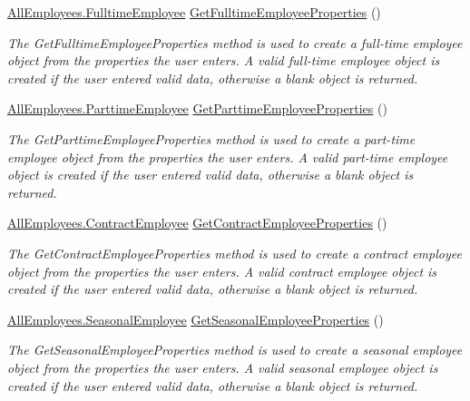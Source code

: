 \begin{DoxyCompactItemize}
\item 
\hyperlink{class_all_employees_1_1_fulltime_employee}{All\+Employees.\+Fulltime\+Employee} \hyperlink{class_the_company_1_1_container_a06dd9fa578f03d192bb0782b19b11c22}{Get\+Fulltime\+Employee\+Properties} ()
\begin{DoxyCompactList}\small\item\em The Get\+Fulltime\+Employee\+Properties method is used to create a full-\/time employee object from the properties the user enters. A valid full-\/time employee object is created if the user entered valid data, otherwise a blank object is returned. \end{DoxyCompactList}\item 
\hyperlink{class_all_employees_1_1_parttime_employee}{All\+Employees.\+Parttime\+Employee} \hyperlink{class_the_company_1_1_container_abf8f2eb5f6f39ff539f0f051979a427a}{Get\+Parttime\+Employee\+Properties} ()
\begin{DoxyCompactList}\small\item\em The Get\+Parttime\+Employee\+Properties method is used to create a part-\/time employee object from the properties the user enters. A valid part-\/time employee object is created if the user entered valid data, otherwise a blank object is returned. \end{DoxyCompactList}\item 
\hyperlink{class_all_employees_1_1_contract_employee}{All\+Employees.\+Contract\+Employee} \hyperlink{class_the_company_1_1_container_aff37e43af89a37628263cd78b80a60a5}{Get\+Contract\+Employee\+Properties} ()
\begin{DoxyCompactList}\small\item\em The Get\+Contract\+Employee\+Properties method is used to create a contract employee object from the properties the user enters. A valid contract employee object is created if the user entered valid data, otherwise a blank object is returned. \end{DoxyCompactList}\item 
\hyperlink{class_all_employees_1_1_seasonal_employee}{All\+Employees.\+Seasonal\+Employee} \hyperlink{class_the_company_1_1_container_aec76c3159677efddcb47b08ce8404478}{Get\+Seasonal\+Employee\+Properties} ()
\begin{DoxyCompactList}\small\item\em The Get\+Seasonal\+Employee\+Properties method is used to create a seasonal employee object from the properties the user enters. A valid seasonal employee object is created if the user entered valid data, otherwise a blank object is returned. \end{DoxyCompactList}\item 

\end{DoxyCompactItemize}
